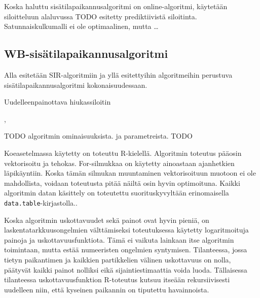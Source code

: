 \documentclass[
  12pt,
  a4paper, twoside]{book}
\begin{document}
Koska haluttu sisätilapaikannusalgoritmi on online-algoritmi, käytetään siloitteluun alaluvussa TODO esitetty prediktiivistä siloitinta. Satunnaiskulkumalli ei ole optimaalinen, mutta \ldots{}

\subsection{WB-sisätilapaikannusalgoritmi}

Alla esitetään SIR-algoritmiin ja yllä esitettyihin algoritmeihin perustuva sisätilapaikannusalgoritmi kokonaisuudessaan.

\begin{algorithm}[H]
\label{wb-positioning}
\DontPrintSemicolon
\SetAlgoShortEnd
{}
\caption{Uudelleenpainottava hiukassiloitin}
\end{algorithm}

,

TODO algoritmin ominaisuuksista. ja parametreista. TODO

Koeasetelmassa käytetty on toteuttu R-kielellä. Algoritmin toteutus pääosin vektorisoitu ja tehokas. For-silmukkaa on käytetty ainoastaan ajanhetkien läpikäyntiin. Koska tämän silmukan muuntaminen vektorisoituun muotoon ei ole mahdollista, voidaan toteutusta pitää näiltä osin hyvin optimoituna. Kaikki algoritmin datan käsittely on toteutettu suorituskyvyltään erinomaisella \texttt{data.table}-kirjastolla..

Koska algoritmin uskottavuudet sekä painot ovat hyvin pieniä, on laskentatarkkuusongelmien välttämiseksi toteutuksessa käytetty logaritmoituja painoja ja uskottavuusfunktiota. Tämä ei vaikuta lainkaan itse algoritmin toimintaan, mutta estää numeeristen ongelmien syntymisen. Tilanteessa, jossa tietyn paikantimen ja kaikkien partikkelien välinen uskottavuus on nolla, päätyvät kaikki painot nolliksi eikä sijaintiestimaattia voida luoda. Tällaisessa tilanteessa uskottavuusfunktion R-toteutus kutsuu itseään rekursiivisesti uudelleen niin, että kyseinen paikannin on tiputettu havainnoista.
\end{document}
